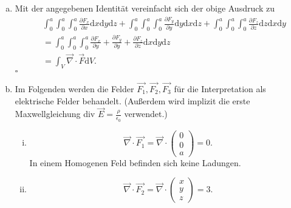 \begin{enumerate}[(a)]
\begin{align*}
\end{align*}
Die Fläche $A_{1}$ liegt in der y-z-Ebene, deswegen kann man das Integral $\mathrm{d}A$ über $A_{1}$ ersetzten durch da $\mathrm{d}y \mathrm{d}z$ in den Grenzen [0,a] und [0,a] ersetzt werden. Damit ergibt sich
\begin{align*}
	\oint_A \vec{F}\mathrm{d}\vec{A}  &= \int_0^a\int_0^a F_{x}(a,y,z) - F_{x}(0,y,z) \mathrm{d}y \mathrm{d}z + \int_0^a\int_0^a F_{y}(x,a,z) \\ &- F_{x}(x,0,z) \mathrm{d}x \mathrm{d}z + \int_0^a\int_0^a F_{z}(x,y,a) - F_{x}(x,y,0) \mathrm{d}x \mathrm{d}y
\end{align*} 
$\pagebreak$
\item Mit der angegebenen Identität vereinfacht sich der obige Ausdruck zu
\begin{align*}
&\int_0^a \int_0^a \int_0^a \frac{\partial F_{x}}{\partial x} \mathrm{d}x\mathrm{d}y\mathrm{d}z + \int_0^a \int_0^a \int_0^a \frac{\partial F_{y}}{\partial y} \mathrm{d}y\mathrm{d}x\mathrm{d}z + 
\int_0^a \int_0^a \int_0^a \frac{\partial F_{z}}{\partial z} \mathrm{d}z\mathrm{d}x\mathrm{d}y
\\ &= \int_0^a \int_0^a \int_0^a  \frac{\partial F_{x}}{\partial y} +  \frac{\partial F_{y}}{\partial y} + \frac{\partial F_{z}}{\partial z} \mathrm{d}x\mathrm{d}y\mathrm{d}z
\\ &= \int_V \vec{\nabla} \cdot \vec{F} \mathrm{d}V.
\end{align*}
\hfill $\square$ 
\item
Im Folgenden werden die Felder $\vec{F_{1}}, \vec{F_{2}}, \vec{F_{3}}$ für die Interpretation als elektrische Felder behandelt. (Außerdem wird implizit die erste Maxwellgleichung div $\vec{E} =  \frac{\rho}{\epsilon_{0}}$ verwendet.)
\begin{enumerate}[(i)]
\item 
\begin{equation*}
\vec{\nabla} \cdot \vec{F_{1}} = \vec{\nabla} \cdot \begin{pmatrix} 0 \\ 0 \\ a \end{pmatrix} = 0.
\end{equation*}
In einem Homogenen Feld befinden sich keine Ladungen.
\item
\begin{equation*}
\vec{\nabla} \cdot \vec{F_{2}} = \vec{\nabla} \cdot \begin{pmatrix} x \\ y \\ z \end{pmatrix} = 3.

\end{equation*}
\end{enumerate}
\end{enumerate}
